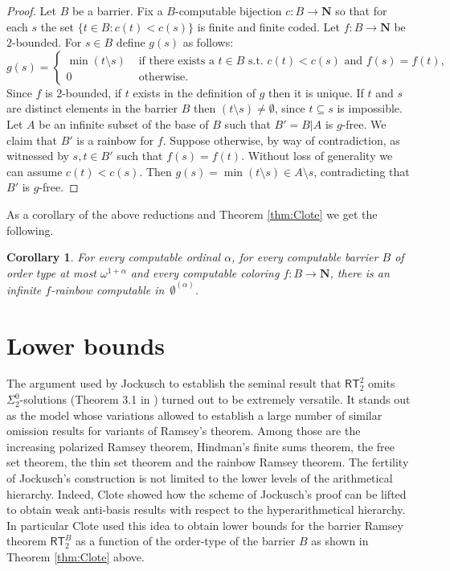 \documentclass{amsart}
\theoremstyle{plain}
\theoremstyle{plain}
\newtheorem{corollary}[theorem]{Corollary}
\newcommand{\om}{\omega}
\newcommand{\al}{{\alpha}}
\newcommand\Nat{\mathbf{N}}
\newcommand\RT{\mathsf{RT}}
\begin{document}
\begin{proof}
Let $B$ be a barrier. 
Fix a $B$-computable bijection $c: B \to \Nat$ so that for each $s$ the set $\{t\in B : c(t)<c(s)\}$ is finite and finite coded.
Let $f:B\to\Nat$ be $2$-bounded. For $s \in B$ define $g(s)$ as follows:
$$
g(s)=
\begin{cases}
\min(t\setminus s) & \mbox{ if there exists a } t\in B \text{ s.t. } c(t)<c(s) \text{ and } f(s)=f(t),\\
0 & \mbox{ otherwise.}
\end{cases}
$$
Since $f$ is $2$-bounded, if $t$ exists in the definition of $g$ then it is unique. If $t$ and $s$ are distinct
elements in the barrier $B$ then $(t\setminus s)\neq \emptyset$, since $t\subseteq s$ is impossible. Let $A$ be 
an infinite subset of the base of $B$ such that $B'=B\vert A$ is $g$-free. We claim that $B'$ is a rainbow for $f$. Suppose otherwise, by way of contradiction, 
as witnessed by $s, t \in B'$ such that $f(s) = f(t)$. Without loss of generality we can assume
$c(t) < c(s)$. Then $g(s) = \min(t\setminus s) \in A \setminus s$, contradicting that $B'$ is $g$-free.
 \end{proof}

As a corollary of the above reductions and Theorem \ref{thm:Clote} we get the following.

\begin{corollary}
For every computable ordinal $\alpha$, for every computable barrier $B$ of order type at most $\om^{1+\al}$ and every computable coloring $f : B \to \Nat$, there is an infinite $f$-rainbow computable in~$\emptyset^{(\al)}$.
\end{corollary}

\section{Lower bounds}\label{sec:low}

The argument used by Jockusch to establish the seminal result that $\RT^2_2$ omits $\Sigma^0_2$-solutions (Theorem 3.1 in \cite{Jockusch1972}) turned out to be extremely versatile. It stands out as the model whose variations allowed to establish a large number of similar omission results for variants of Ramsey's theorem. Among those are the increasing polarized Ramsey theorem, Hindman's finite sums theorem, the free set theorem, the thin set theorem and the rainbow Ramsey theorem. The fertility of Jockusch's construction is not limited to the lower levels of the arithmetical hierarchy. Indeed, Clote \cite{Clote1984} showed how the scheme of Jockusch's proof can be lifted to obtain weak anti-basis results with respect to the hyperarithmetical hierarchy. In particular Clote used this idea to obtain lower bounds for the barrier Ramsey theorem $\RT^B_2$ as a function of the order-type of the barrier $B$ 
as shown in Theorem \ref{thm:Clote} above.
\end{document}
